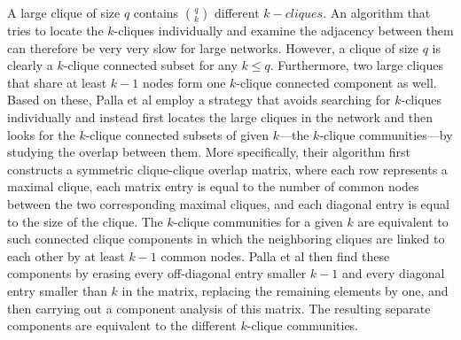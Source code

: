 A large clique of size $q$ contains $\binom{q}{k}$ different $k-cliques$.
An algorithm that tries to locate the $k$-cliques individually and examine the adjacency
between them can therefore be very very slow for large networks. However, a clique of size $q$
is clearly a $k$-clique connected subset for any $k \leq q$. Furthermore, two large
cliques that share at least $k-1$ nodes form one $k$-clique connected component as well.
Based on these, Palla et al employ a strategy that avoids searching for $k$-cliques individually
and instead first locates the large cliques in the network and then looks for the $k$-clique connected subsets of given $k$---the $k$-clique communities---by studying the overlap between them.
More specifically, their algorithm first constructs a symmetric clique-clique overlap matrix, 
where each row represents a maximal clique, each matrix entry is equal to the number of common nodes between the two corresponding maximal cliques, and each diagonal entry is equal to the
size of the clique. The $k$-clique communities for a given $k$ are equivalent to such connected 
clique components in which the neighboring cliques are linked to each other by at least $k-1$ common nodes. Palla et al then find these components by erasing every off-diagonal entry smaller $k-1$ and every diagonal entry smaller than $k$ in the matrix, replacing the remaining elements by one, and then carrying out a component analysis of this matrix. The resulting separate components are equivalent to the different $k$-clique communities.
       


